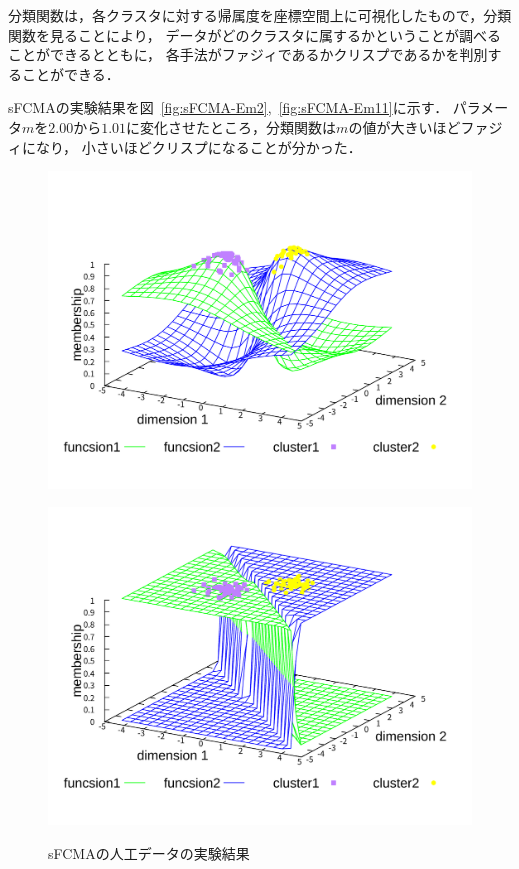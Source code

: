 \documentclass[a4j,12pt,dvipdfmx,oneside]{jsbook}
\theoremstyle{definition}
\begin{document}
  分類関数は，各クラスタに対する帰属度を座標空間上に可視化したもので，分類関数を見ることにより，
  データがどのクラスタに属するかということが調べることができるとともに，
  各手法がファジィであるかクリスプであるかを判別することができる．
  
  sFCMAの実験結果を図~\ref{fig:sFCMA-Em2},~\ref{fig:sFCMA-Em11}に示す．
  パラメータ$m$を$2.00$から$1.01$に変化させたところ，分類関数は$m$の値が大きいほどファジィになり，
  小さいほどクリスプになることが分かった．

  \begin{figure}[p]
   \centering
   \begin{minipage}{0.43\hsize}
    \includegraphics[width=\linewidth]{sFCMA-Em2.pdf}
    \label{fig:sFCMA-Em2}
   \end{minipage}
   \begin{minipage}{0.43\hsize}
    \includegraphics[width=\linewidth]{sFCMA-Em11.pdf}
    \label{fig:sFCMA-Em11}
   \end{minipage}
   \vspace*{0.5cm}
   \caption{sFCMAの人工データの実験結果}
   \label{fig:sFCMA}
  \end{figure}
    
\end{document}

